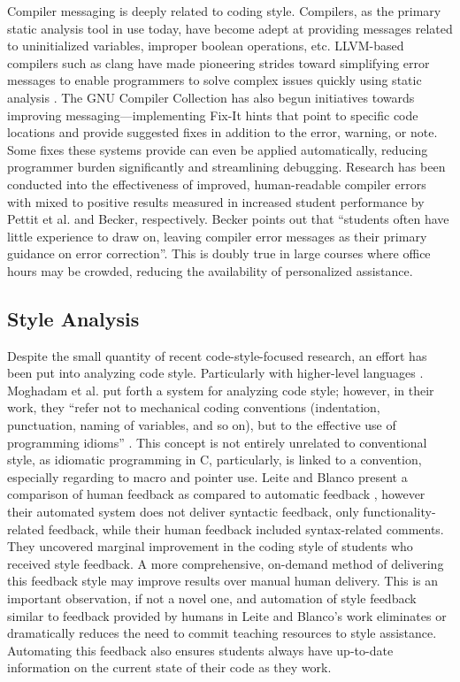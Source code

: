 \documentclass[sigconf]{acmart}
\begin{document}
Compiler messaging is deeply related to coding style. Compilers, as the primary static
analysis tool in use today, have become adept at providing messages related to
uninitialized variables, improper boolean operations, etc. LLVM-based compilers
such as clang \cite{Clang} have made pioneering strides toward simplifying error messages to enable
programmers to solve complex issues quickly using static analysis \cite{ClangStaticChecks}. The GNU Compiler Collection \cite{GCC} has also begun initiatives towards
improving messaging---implementing Fix-It hints \cite{GCCFixItHints} that point to specific code locations and
provide suggested fixes in addition to the error, warning, or note. Some fixes these systems provide can even be applied
automatically, reducing programmer burden significantly and streamlining debugging.
Research has been conducted into the effectiveness of improved, human-readable compiler
errors with mixed \cite{10.1145/3017680.3017768} to positive results
\cite{10.1145/2839509.2844584} measured in increased student performance by Pettit et al.
and Becker, respectively. Becker points out that ``students often have little experience
to draw on, leaving compiler error messages as their primary guidance on error
correction''. This is doubly true in large courses where office hours may be crowded,
reducing the availability of personalized assistance.

\subsection{Style Analysis}

Despite the small quantity of recent code-style-focused research, an effort has been put
into analyzing code style. Particularly with higher-level languages \cite{pylint}. 
Moghadam et al. put forth a system for analyzing code style; however, in their work, they ``refer
not to mechanical coding conventions (indentation, punctuation, naming of variables, and
so on), but to the effective use of programming idioms'' \cite{10.1145/2724660.2728672}.
This concept is not entirely unrelated to conventional style, as idiomatic programming
in C, particularly, is linked to a convention, especially regarding to macro and pointer
use. Leite and Blanco present a comparison of human feedback as compared to automatic
feedback \cite{10.1145/3328778.3366921}, however their automated system does not deliver
syntactic feedback, only functionality-related feedback, while their human feedback
included syntax-related comments. They uncovered marginal improvement in the coding style of
students who received style feedback.  A more comprehensive, on-demand method of delivering
this feedback style may improve results over manual human delivery. This is an important
observation, if not a novel one,
and automation of style feedback similar to feedback provided
by humans in Leite and Blanco's work eliminates or
dramatically reduces the need to commit teaching resources to style assistance. Automating this
feedback also ensures students always have up-to-date information on the current state of their code as they work.
\end{document}
